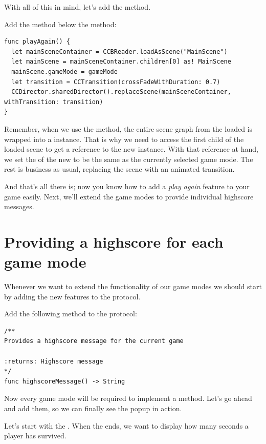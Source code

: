 With all of this in mind, let's add the  method.
\begin{leftbar}
Add the  method below the  method:
\begin{lstlisting}
func playAgain() {
  let mainSceneContainer = CCBReader.loadAsScene("MainScene")
  let mainScene = mainSceneContainer.children[0] as! MainScene
  mainScene.gameMode = gameMode
  let transition = CCTransition(crossFadeWithDuration: 0.7)
  CCDirector.sharedDirector().replaceScene(mainSceneContainer, withTransition: transition)
}
\end{lstlisting}
\end{leftbar}
Remember, when we use the  method, the
entire scene graph from the loaded \ccbfile{} is wrapped into a \ccscene{}
instance. That is why we need to access the first child of the loaded scene to
get a reference to the new  instance. With that reference
at hand, we set the  of the new  to
be the same as the currently selected game mode. The rest is business as usual,
replacing the scene with an animated transition.

And that's all there is; now you know how to add a \textit{play again} feature
to your game easily. Next, we'll extend the game modes to provide individual
highscore messages.

\section{Providing a highscore for each game mode}
Whenever we want to extend the functionality of our game modes we should start
by adding the new features to the  protocol.
\begin{leftbar}
Add the following method to the  protocol:
\begin{lstlisting}
/**
Provides a highscore message for the current game

:returns: Highscore message
*/
func highscoreMessage() -> String
\end{lstlisting}
\end{leftbar}
Now every game mode will be required to implement a
 method. Let's go ahead and add them, so we can
finally see the popup in action.

Let's start with the . When the
 ends, we want to display how many seconds a player
has survived.

